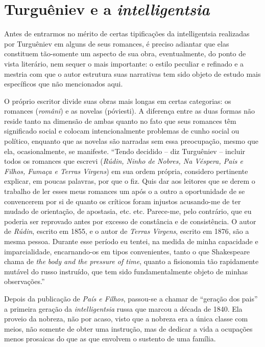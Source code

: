 \section{Turguêniev e a \emph{intelligentsia}}

Antes de entrarmos no mérito de certas tipificações da intelligentsia
realizadas por Turguêniev em alguns de seus romances, é preciso adiantar
que elas constituem tão-somente um aspecto de sua obra, eventualmente,
do ponto de vista literário, nem sequer o mais importante: o estilo
peculiar e refinado e a mestria com que o autor estrutura suas
narrativas tem sido objeto de estudo mais específicos que não
mencionados aqui.

O próprio escritor divide suas obras mais longas em certas categorias:
os romances (\emph{români}) e as novelas (póviesti). A diferença entre
as duas formas não reside tanto na dimensão de ambas quanto no fato que
seus romances têm significado social e colocam intencionalmente
problemas de cunho social ou político, enquanto que as novelas são
narradas sem essa preocupação, mesmo que ela, ocasionalmente, se
manifeste. ``Tendo decidido -- diz Turguêniev -- incluir todos os
romances que escrevi (\emph{Rúdin, Ninho de Nobres, Na Véspera, Pais e
Filhos, Fumaça e Terras Virgens}) em sua ordem própria, considero
pertinente explicar, em poucas palavras, por que o fiz. Quis dar aos
leitores que se derem o trabalho de ler esses meus romances um após o a
outro a oportunidade de se convencerem por si de quanto os críticos
foram injustos acusando-me de ter mudado de orientação, de apostasia,
etc. etc. Parece-me, pelo contrário, que eu poderia ser reprovado antes
por excesso de constância e de consistência. O autor de \emph{Rúdin},
escrito em 1855, e o autor de \emph{Terras Virgens}, escrito em 1876,
são a mesma pessoa. Durante esse período eu tentei, na medida de minha
capacidade e imparcialidade, encarnando-os em tipos convenientes, tanto
o que Shakespeare chama de \emph{the body and the pressure of time},
quanto a fisionomia tão rapidamente mutável do russo instruído, que tem
sido fundamentalmente objeto de minhas observações.''

Depois da publicação de \emph{País e Filhos}, passou-se a chamar de
``geração dos pais'' a primeira geração da \emph{intelligentsia} russa
que marcou a década de 1840. Ela proveio da nobreza, não por acaso,
visto que a nobreza era a única classe com meios, não somente de obter
uma instrução, mas de dedicar a vida a ocupações menos prosaicas do que
as que envolvem o sustento de uma família.

